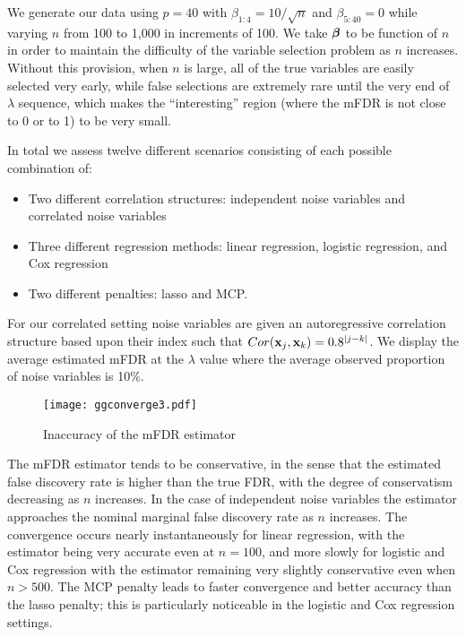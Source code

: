 We generate our data using $p = 40$ with $\beta_{1:4} = 10/\sqrt{n}$ and $\beta_{5:40} = 0$ while varying $n$ from 100 to 1,000 in increments of 100. We take $\boldsymbol{\beta}$ to be function of $n$ in order to maintain the difficulty of the variable selection problem as $n$ increases.  Without this provision, when $n$ is large, all of the true variables are easily selected very early, while false selections are extremely rare until the very end of $\lambda$ sequence, which makes the ``interesting'' region (where the mFDR is not close to 0 or to 1) to be very small.

In total we assess twelve different scenarios consisting of each possible combination of:
\begin{itemize}
\item Two different correlation structures: independent noise variables and correlated noise variables
\item Three different regression methods: linear regression, logistic regression, and Cox regression
\item Two different penalties: lasso and MCP. 
\end{itemize}
For our correlated setting noise variables are given an autoregressive correlation structure based upon their index such that $Cor(\mathbf{x}_j,\mathbf{x}_k) = 0.8^{|j - k|}$. We display the average estimated mFDR at the $\lambda$ value where the average observed proportion of noise variables is 10\%.

\begin{figure} [!htb]
 \centering
  \texttt{[image: ggconverge3.pdf]}
  \caption{Inaccuracy of the mFDR estimator}
\end{figure}

The mFDR estimator tends to be conservative, in the sense that the estimated false discovery rate is higher than the true FDR, with the degree of conservatism decreasing as $n$ increases. In the case of independent noise variables the estimator approaches the nominal marginal false discovery rate as $n$ increases. The convergence occurs nearly instantaneously for linear regression, with the estimator being very accurate even at $n=100$, and more slowly for logistic and Cox regression with the estimator remaining very slightly conservative even when $n > 500$. The MCP penalty leads to faster convergence and better accuracy than the lasso penalty; this is particularly noticeable in the logistic and Cox regression settings.


